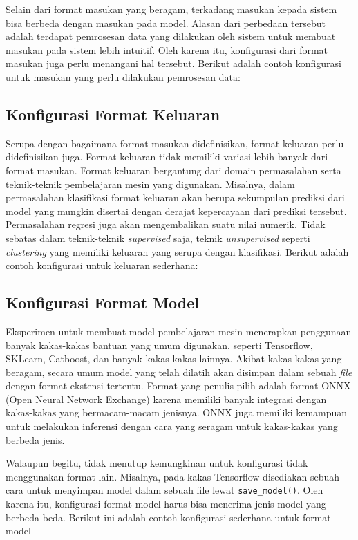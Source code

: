 Selain dari format masukan yang beragam, terkadang masukan kepada sistem bisa berbeda dengan masukan pada model.
Alasan dari perbedaan tersebut adalah terdapat pemrosesan data yang dilakukan oleh sistem untuk membuat masukan pada sistem lebih intuitif.
Oleh karena itu, konfigurasi dari format masukan juga perlu menangani hal tersebut.
Berikut adalah contoh konfigurasi untuk masukan yang perlu dilakukan pemrosesan data:


\subsection{Konfigurasi Format Keluaran}
Serupa dengan bagaimana format masukan didefinisikan, format keluaran perlu didefinisikan juga.
Format keluaran tidak memiliki variasi lebih banyak dari format masukan.
Format keluaran bergantung dari domain permasalahan serta teknik-teknik pembelajaran mesin yang digunakan.
Misalnya, dalam permasalahan klasifikasi format keluaran akan berupa sekumpulan prediksi dari model yang mungkin disertai dengan derajat kepercayaan dari prediksi tersebut.
Permasalahan regresi juga akan mengembalikan suatu nilai numerik.
Tidak sebatas dalam teknik-teknik \textit{supervised} saja, teknik \textit{unsupervised} seperti \textit{clustering} yang memiliki keluaran yang serupa dengan klasifikasi.
Berikut adalah contoh konfigurasi untuk keluaran sederhana:


\subsection{Konfigurasi Format Model}
Eksperimen untuk membuat model pembelajaran mesin menerapkan penggunaan banyak kakas-kakas bantuan yang umum digunakan, seperti Tensorflow, SKLearn, Catboost, dan banyak kakas-kakas lainnya.
Akibat kakas-kakas yang beragam, secara umum model yang telah dilatih akan disimpan dalam sebuah \textit{file} dengan format ekstensi tertentu.
Format yang penulis pilih adalah format ONNX (Open Neural Network Exchange) karena memiliki banyak integrasi dengan kakas-kakas yang bermacam-macam jenisnya.
ONNX juga memiliki kemampuan untuk melakukan inferensi dengan cara yang seragam untuk kakas-kakas yang berbeda jenis.

Walaupun begitu, tidak menutup kemungkinan untuk konfigurasi tidak menggunakan format lain.
Misalnya, pada kakas Tensorflow disediakan sebuah cara untuk menyimpan model dalam sebuah file lewat \texttt{save_model()}.
Oleh karena itu, konfigurasi format model harus bisa menerima jenis model yang berbeda-beda.
Berikut ini adalah contoh konfigurasi sederhana untuk format model

